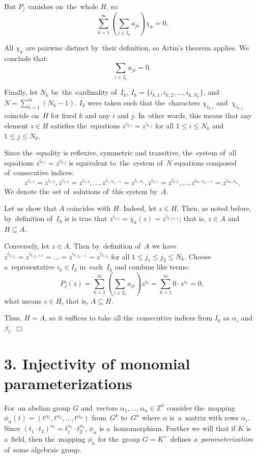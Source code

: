 \documentclass[twoside]{article}
\begin{document}
    But $P_j$ vanishes on~the~whole $H$, so:
    $$
        \sum_{k = 1}^{m} \left( \sum_{i \in I_k} a_{ji} \right) \chi_k = 0.
    $$

    All $\chi_k$ are pairwise distinct by~their definition, so Artin's theorem applies. We conclude that:
    $$
    \sum_{i \in I_k} a_{ji} = 0.
    $$

    Finally, let $N_k$ be~the~cardinality of~$I_k$, $I_k = \{i_{k, 1}, i_{k, 2}, \ldots, i_{k, N_k}\}$, and~$N = \sum_{k = 1}^m (N_k - 1)$.
    $I_k$ were taken such that the~characters $\chi_{i_{k, i}}$ and~$\chi_{i_{k, j}}$ coincide on~$H$ for fixed $k$ and any $i$ and $j$.
    In~other words, this means that any element $z \in H$ satisfies the~equations $z^{i_{k, i}} = z^{i_{k, j}}$ for all $1 \leq i \leq N_k$
    and~$1 \leq j \leq N_k$.

    Since the~equality is reflexive, symmetric and transitive, the~system of~all equations $z^{i_{k, i}} = z^{i_{k, j}}$
    is equivalent to~the~system of~$N$ equations composed of~consecutive indices:
    $$
        z^{i_{1, 1}} = z^{i_{1, 2}}, z^{i_{1, 2}} = z^{i_{1, 3}}, \ldots, z^{i_{1, N_1 - 1}} = z^{i_{1, N_1}}, z^{i_{2, 1}} = z^{i_{2, 2}}, \ldots, z^{i_{m, N_m - 1}} = z^{i_{m, N_m}}.
    $$
    We denote the~set of~solutions of~this system by~$A$.

    Let us show that $A$ coincides with $H$. Indeed, let $z \in H$. Then, as noted before,
    by~definition of~$I_k$ is is true that $z^{i_{k, j}} = \chi_k(z) = z^{i_{k, j + 1}}$;
    that is, $z \in A$ and~$H \subseteq A$.

    Conversely, let $z \in A$. Then by~definition of~$A$ we have $z^{i_{k, j_1}} = z^{i_{k, j_1 + 1}} = \ldots = z^{i_{k, j_2 - 1}} = z^{i_{k, j_2}}$
    for all $1 \leq j_1 \leq j_2 \leq N_k$. Choose a~representative $i_k \in I_k$ in~each~$I_k$
    and combine like terms:
    $$
        P_j(z) = \sum_{k = 1}^{m} \left( \sum_{i \in I_k} a_{ji} \right) z^{i_k} = \sum_{k = 1}^{m} 0 \cdot z^{i_k} = 0,
    $$
    what means $z \in H$, that is, $A \subseteq H$.

    Thus, $H = A$, so it suffices to take all the~consecutive indices from $I_k$ as $\alpha_i$ and $\beta_i$.
\hfill$\Box$\medskip

\section*{3. Injectivity of monomial parameterizations}

For~an abelian group $G$ and~vectors $\alpha_1, \ldots, \alpha_n \in \mathbb{Z}^k$ consider the~mapping
$\phi_\alpha(t) = (t^{\alpha_1}, t^{\alpha_2}, \ldots, t^{\alpha_n})$ from~$G^k$ to~$G^n$ where $\alpha$ is~a~matrix
with rows $\alpha_i$. Since $(t_1 \cdot t_2)^{\alpha_i} = t_1^{\alpha_i} \cdot t_2^{\alpha_i}$,
$\phi_\alpha$ is a~homomorphism. Further we will that if $K$ is a~field, then the~mapping $\phi_\alpha$
for the~group $G = K^\times$ defines \textit{a~parameterization} of~some algebraic group.
\end{document}
